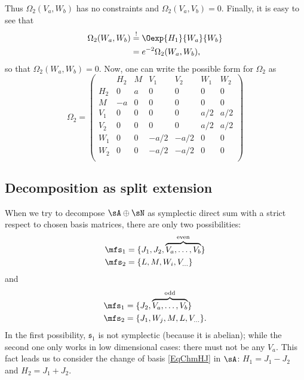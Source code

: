 Thus $\Omega_2(V_a,W_b)$ has no constraints and $\Omega_2(V_a,V_b)=0$. Finally, it is easy to see that
\begin{equation}
\begin{split}
\Omega_2(W_a,W_b)&\stackrel{!}{=}\Oexp{H_1}{W_a}{W_b}\\
                 &=e^{-2}\Omega_2(W_a,W_b),
\end{split}
\end{equation}
so that $\Omega_2(W_a,W_b)=0$. Now, one can write the possible form for $\Omega_2$ as
\begin{equation}
\Omega_2=\left(
\begin{array}{c|c|c|c|c|c|c}
 & H_2 & M & V_1 & V_2 & W_1 & W_2 \\
 \hline
H_2 & 0 & a & 0 & 0 & 0 & 0 \\
\hline
M & -a & 0 & 0 & 0 & 0 & 0 \\
\hline
V_1 & 0 & 0 & 0 & 0 & a/2 & a/2 \\
\hline
V_2 & 0 & 0 & 0 & 0 & a/2 & a/2 \\
\hline
W_1 & 0 & 0 & -a/2 & -a/2 & 0 & 0  \\
\hline
W_2 & 0 & 0 & -a/2 & -a/2 & 0 & 0  \\
\end{array}
\right)
\end{equation}



\subsection{Decomposition as split extension}

When we try to decompose $\sA\oplus\sN$ as symplectic direct sum with a strict respect to chosen basis matrices, there are only two possibilities:
\begin{equation}
 \begin{split}
  \mfs_1&=\{ J_1,J_2,\overbrace{V_a,\ldots,V_b}^{\text{even}}  \}\\
\mfs_2&=\{ L,M,W_i,V_{\ldots}  \}
\end{split}
\end{equation}
and
\begin{equation}
 \begin{split}
  \mfs_1&=\{ J_2,\overbrace{V_a,\ldots,V_b}^{\text{odd}}  \}\\
\mfs_2&=\{ J_1,W_j,M,L,V_{\ldots}  \}  .
\end{split}
\end{equation}
In the first possibility, $\mathfrak{s}_{1}$ is not symplectic (because it is abelian); while the second one only works in low dimensional cases: there must not be any $V_a$. This fact leads us to consider  the change of basis \eqref{EqChmHJ} in $\sA$: $H_1=J_1-J_2$ and $H_2=J_1+J_2$.


